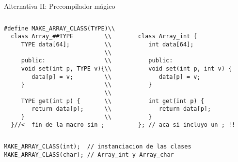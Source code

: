 \begin{frame}{Alternativa II: Precompilador m\'agico}
   \begin{columns}[t]
      \begin{column}{.52\linewidth}
         \begin{lstlisting}[style=normal]
#define MAKE_ARRAY_CLASS(TYPE)\\
  class Array_##TYPE         \\
     TYPE data[64];          \\
                             \\
     public:                 \\
     void set(int p, TYPE v){\\
        data[p] = v;         \\
     }                       \\
                             \\
     TYPE get(int p) {       \\
        return data[p];      \\
     }                       \\
  }//<- fin de la macro sin ;
         \end{lstlisting}
      \end{column}
      \begin{column}{.42\linewidth}
         \begin{lstlisting}[style=normalnonumbers]

class Array_int {
   int data[64];

   public:
   void set(int p, int v) {
      data[p] = v;
   }

   int get(int p) {
      return data[p];
   }
}; // aca si incluyo un ; !!
         \end{lstlisting}
      \end{column}
   \end{columns}
   \begin{lstlisting}[style=normal]
MAKE_ARRAY_CLASS(int);  // instanciacion de las clases
MAKE_ARRAY_CLASS(char); // Array_int y Array_char
   \end{lstlisting}
\end{frame}


